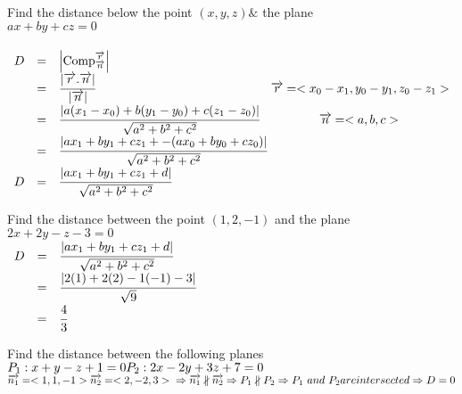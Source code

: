 \noindent{\color{smalt(darkpowderblue)}\rule{\linewidth}{.2mm}}
\begin{example}
Find the distance below the point $(x,y,z) \&$ the plane \\ $ax+by+cz=0 $\\
{}\\
$\begin{array}{rcl}
D & = & \left| \mathrm{Comp}_{\overrightarrow{n}}^{\overrightarrow{r}} \right| \\
 & = & \cfrac{|\overrightarrow{r}.\overrightarrow{n}|}{|\overrightarrow{n}|} \hspace{5cm} \overrightarrow{r}=<x_0-x_1,y_0-y_1,z_0-z_1> \\
 & = & \cfrac{|a(x_1-x_0)+b(y_1-y_0)+c(z_1-z_0)|}{\sqrt{a^2+b^2+c^2}} \hspace{1.7cm} \overrightarrow{n}=<a,b,c> \\
 & = & \cfrac{|ax_1+by_1+cz_1+-(ax_0+by_0+cz_0)|}{\sqrt{a^2+b^2+c^2}} \\
D& = & \cfrac{|ax_1+by_1+cz_1+d|}{\sqrt{a^2+b^2+c^2}}
\end{array}$
\end{example} 
\noindent{\color{smalt(darkpowderblue)}\rule{\linewidth}{.2mm}}
\begin{example}
Find the distance between the point $(1,2,-1)$ and the plane $2x+2y-z-3=0$\\
{} 
$\begin{array}{rcl}
 D& = & \cfrac{|ax_1+by_1+cz_1+d|}{\sqrt{a^2+b^2+c^2}} \\
 & = & \cfrac{|2(1)+2(2)-1(-1)-3|}{\sqrt{9}}\\
 & = & \cfrac{4}{3}
\end{array}$
\end{example}

\noindent{\color{smalt(darkpowderblue)}\rule{\linewidth}{.2mm}}
\begin{example}
Find the distance between the following planes \\
$P_1 : x+y-z+1 =0\\
P_2 : 2x-2y+3z+7=0 $\\
{}
$\overrightarrow{n_1}=<1,1,-1> \\
\overrightarrow{n_2}=<2,-2,3> \\
\Rightarrow \overrightarrow{n_1}
\nparallel \overrightarrow{n_2} \\
\Rightarrow P_1 \nparallel P_2 \\
\Rightarrow P_1 ~ and ~ P_2  are intersected \\
\Rightarrow D=0$
\end{example}

